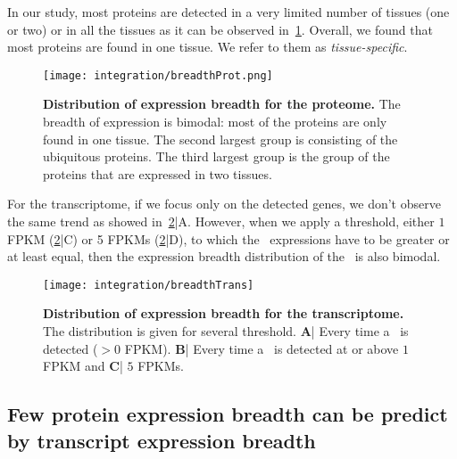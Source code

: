 In our study, most proteins are detected in a very limited number of tissues (one
or two) or in all the tissues as it can be observed in~\cref{fig:breadthProt}.
Overall, we found that most proteins are found in one tissue. We refer to them as
\emph{tissue-specific}.

\begin{figure}[!htbp]
    \texttt{[image: integration/breadthProt.png]}\centering
    \caption[Distribution of expression breadth for the proteome]
    {\label{fig:breadthProt}\textbf{Distribution of expression breadth for the
    proteome.} The breadth of expression is bimodal: most of the proteins are
    only found in one tissue. The second largest group is consisting of
    the ubiquitous proteins. The third largest group is the group of the proteins
    that are expressed in two tissues.}
\end{figure}


For the transcriptome, if we focus only on the detected genes, we don’t observe
the same trend as showed in~\cref{fig:breadthTrans}|A.
However, when we apply a threshold, either $1$ \gls{FPKM}
(\cref{fig:breadthTrans}|C) or
5 \glspl{FPKM} (\cref{fig:breadthTrans}|D), to which the \mRNA\ expressions
have to be greater or at least equal, then the expression breadth distribution
of the \mRNAs\ is also bimodal.

\begin{figure}[!htbp]
    \texttt{[image: integration/breadthTrans]}\centering
    \caption[Distribution of expression breadth for the transcriptome]
    {\label{fig:breadthTrans}\textbf{Distribution of expression breadth for the
    transcriptome.} The distribution is given for several threshold.
    \textbf{A}| Every time a \mRNA\ is detected ($> 0$ \gls{FPKM}).
    \textbf{B}| Every time a \mRNA\ is detected at or above $1$ \gls{FPKM} and
    \textbf{C}| $5$ \glspl{FPKM}.}
\end{figure}

\subsection{Few protein expression breadth can be predict by transcript
expression breadth}

